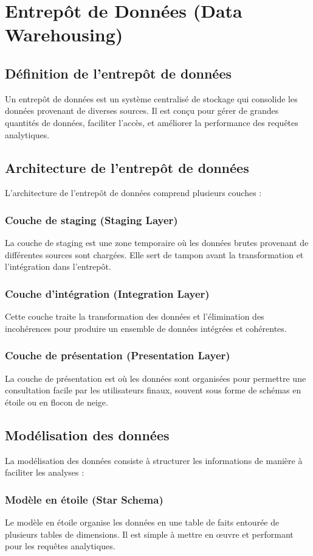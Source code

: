 \documentclass[a4paper,12pt]{report}
\begin{document}
\chapter{Entrepôt de Données (Data Warehousing)}
\section{Définition de l'entrepôt de données}
Un entrepôt de données est un système centralisé de stockage qui consolide les données provenant de diverses sources. Il est conçu pour gérer de grandes quantités de données, faciliter l'accès, et améliorer la performance des requêtes analytiques.

\section{Architecture de l'entrepôt de données}
L'architecture de l'entrepôt de données comprend plusieurs couches :
\subsection{Couche de staging (Staging Layer)}
La couche de staging est une zone temporaire où les données brutes provenant de différentes sources sont chargées. Elle sert de tampon avant la transformation et l'intégration dans l'entrepôt.
\subsection{Couche d'intégration (Integration Layer)}
Cette couche traite la transformation des données et l'élimination des incohérences pour produire un ensemble de données intégrées et cohérentes.
\subsection{Couche de présentation (Presentation Layer)}
La couche de présentation est où les données sont organisées pour permettre une consultation facile par les utilisateurs finaux, souvent sous forme de schémas en étoile ou en flocon de neige.


\section{Modélisation des données}
La modélisation des données consiste à structurer les informations de manière à faciliter les analyses :
\subsection{Modèle en étoile (Star Schema)}
Le modèle en étoile organise les données en une table de faits entourée de plusieurs tables de dimensions. Il est simple à mettre en œuvre et performant pour les requêtes analytiques.
\end{document}
